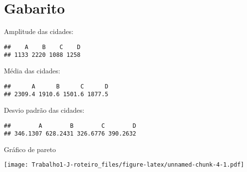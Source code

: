 \documentclass[]{article}
\begin{document}
\section{Gabarito}\label{gabarito}

Amplitude das cidades:

\begin{verbatim}
##    A    B    C    D 
## 1133 2220 1088 1258
\end{verbatim}

Média das cidades:

\begin{verbatim}
##      A      B      C      D 
## 2309.4 1910.6 1501.6 1877.5
\end{verbatim}

Desvio padrão das cidades:

\begin{verbatim}
##        A        B        C        D 
## 346.1307 628.2431 326.6776 390.2632
\end{verbatim}

Gráfico de pareto

\texttt{[image: Trabalho1-J-roteiro\_files/figure-latex/unnamed-chunk-4-1.pdf]}\\
\end{document}
